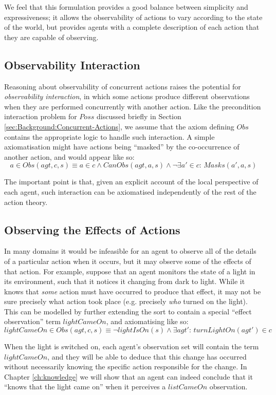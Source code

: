We feel that this formulation provides a good balance between simplicity
and expressiveness; it allows the observability of actions to vary
according to the state of the world, but provides agents with a complete
description of each action that they are capable of observing.


\subsection{Observability Interaction}

Reasoning about observability of concurrent actions raises the potential
for \emph{observability interaction}, in which some actions produce
different observations when they are performed concurrently with another
action. Like the precondition interaction problem for $Poss$ discussed
briefly in Section \ref{sec:Background:Concurrent-Actions}, we assume
that the axiom defining $Obs$ contains the appropriate logic to handle
such interaction. A simple axiomatisation might have actions being
{}``masked'' by the co-occurrence of another action, and would appear
like so:\[
a\in Obs(agt,c,s)\equiv a\in c\wedge CanObs(agt,a,s)\wedge\neg\exists a'\in c:\, Masks(a',a,s)\]


The important point is that, given an explicit account of the local
perspective of each agent, such interaction can be axiomatised independently
of the rest of the action theory.


\subsection{Observing the Effects of Actions}

In many domains it would be infeasible for an agent to observe all
of the details of a particular action when it occurs, but it may observe
some of the effects of that action. For example, suppose that an agent
monitors the state of a light in its environment, such that it notices
it changing from dark to light. While it knows that \emph{some} action
must have occurred to produce that effect, it may not be sure precisely
what action took place (e.g. precisely \emph{who} turned on the light).
This can be modelled by further extending the  sort
to contain a special {}``effect observation'' term $lightCameOn$,
and axiomatising like so:\[
lightCameOn\in Obs(agt,c,s)\equiv\neg lightIsOn(s)\wedge\exists agt':\, turnLightOn(agt')\in c\]


When the light is switched on, each agent's observation set will contain
the term $lightCameOn$, and they will be able to deduce that this
change has occurred without necessarily knowing the specific action
responsible for the change. In Chapter \ref{ch:knowledge} we will
show that an agent can indeed conclude that it {}``knows that the
light came on'' when it perceives a $listCameOn$ observation.


